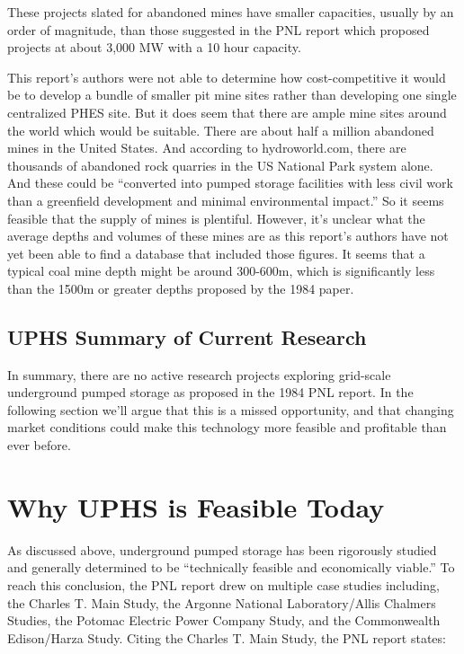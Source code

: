 \documentclass[hidelinks,12pt,a4paper]{article}
\begin{document}
These projects slated for abandoned mines have smaller capacities, usually by an order of magnitude, than those suggested in the PNL report which proposed projects at about 3,000 MW with a 10 hour capacity. \cite{UndergroundPumpedHydroelectricStorage}

This report's authors were not able to determine how cost-competitive it would be to develop a bundle of smaller pit mine sites rather than developing one single centralized PHES site. But it does seem that there are ample mine sites around the world which would be suitable. There are about half a million abandoned mines in the United States. \cite{MappingInactiveMetalMinesAcrossTheUS} And according to hydroworld.com, there are thousands of abandoned rock quarries in the US National Park system alone. And these could be “converted into pumped storage facilities with less civil work than a greenfield development and minimal environmental impact.” \cite{PumpedStorageElmhurstQuarryProject} So it seems feasible that the supply of mines is plentiful. However, it's unclear what the average depths and volumes of these mines are as this report's authors have not yet been able to find a database that included those figures. It seems that a typical coal mine depth might be around 300-600m, \cite{UndergroundPumpedStorageHydroInAbandonedCoalMines} which is significantly less than the 1500m or greater depths proposed by the 1984 paper.


\subsection{UPHS Summary of Current Research}
In summary, there are no active research projects exploring grid-scale underground pumped storage as proposed in the 1984 PNL report. In the following section we'll argue that this is a missed opportunity, and that changing market conditions could make this technology more feasible and profitable than ever before.

\pagebreak[4]
\section{Why UPHS is Feasible Today}
As discussed above, underground pumped storage has been rigorously studied and generally determined to be “technically feasible and economically viable.” \cite{UndergroundPumpedHydroelectricStorage} To reach this conclusion, the PNL report drew on multiple case studies including, the Charles T. Main Study, the Argonne National Laboratory/Allis Chalmers Studies, the Potomac Electric Power Company Study, and the Commonwealth Edison/Harza Study. Citing the Charles T. Main Study, the PNL report states:
\end{document}

